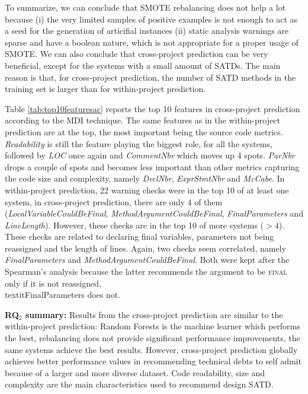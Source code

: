 To summarize, we can conclude that SMOTE rebalancing does not help a lot because (i) the very limited samples of positive examples is not enough to act as a seed for the generation of articifial instances (ii) static analysis warnings are sparse and have a boolean nature, which is not appropriate for a proper usage of SMOTE. We can also conclude that cross-project prediction can be very beneficial, except for the systems with a small amount of SATDs. The main reason is that, for cross-project prediction, the number of SATD methods in the training set is larger than for within-project prediction.



Table \ref{tab:top10featuresac} reports the top 10 features in cross-project prediction according to the MDI technique. The same features as in the within-project prediction are at the top, the most important being the source code metrics. \textit{Readability} is still the feature playing the biggest role, for all the systems, followed by \textit{LOC} once again and \textit{CommentNbr} which moves up 4 spots. \textit{ParNbr} drops a couple of spots and becomes less important than other metrics capturing the code size and complexity, namely \textit{DeclNbr}, \textit{ExprStmtNbr} and \textit{McCabe}. In within-project prediction, 22 warning checks were in the top 10 of at least one system, in cross-project prediction, there are only 4 of them (\textit{LocalVariableCouldBeFinal}, \textit{MethodArgumentCouldBeFinal}, \textit{FinalParameters} and \textit{LineLength}). However, these checks are in the top 10 of more systems ($>4$). These checks are related to declaring final variables, parameters not being reassigned and the length of lines. Again, two checks seem correlated, namely \textit{FinalParameters} and \textit{MethodArgumentCouldBeFinal}. Both were kept after the Spearman's analysis because the latter recommends the argument to be \textsc{final} only if it is not reassigned, \\textit{FinalParameters} does not.

\begin{mdframed}
	{\bf RQ$_2$ summary:} Results from the cross-project prediction are similar to the within-project prediction: Random Forests is the machine learner which performs the best, rebalancing does not provide significant performance improvements, the same systems achieve the best results. However, cross-project prediction globally achieves better performance values in recommending technical debts to self admit because of a larger and more diverse dataset. Code readability, size and complexity are the main characteristics used to recommend design SATD.
\end{mdframed}

